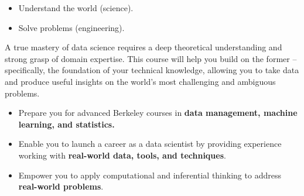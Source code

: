 \documentclass[
  letterpaper,
  DIV=11,
  numbers=noendperiod]{scrreprt}
\providecommand{\tightlist}{%
  \setlength{\itemsep}{0pt}\setlength{\parskip}{0pt}}\usepackage{longtable,booktabs,array}
\begin{document}
\begin{itemize}
\tightlist
\item
  Understand the world (science).
\item
  Solve problems (engineering).
\end{itemize}

A true mastery of data science requires a deep theoretical understanding
and strong grasp of domain expertise. This course will help you build on
the former -- specifically, the foundation of your technical knowledge,
allowing you to take data and produce useful insights on the world's
most challenging and ambiguous problems.

\begin{tcolorbox}[enhanced jigsaw, titlerule=0mm, breakable, opacityback=0, leftrule=.75mm, opacitybacktitle=0.6, colback=white, colframe=quarto-callout-note-color-frame, colbacktitle=quarto-callout-note-color!10!white, left=2mm, rightrule=.15mm, arc=.35mm, toprule=.15mm, coltitle=black, bottomrule=.15mm, bottomtitle=1mm, toptitle=1mm, title=\textcolor{quarto-callout-note-color}{\faInfo}\hspace{0.5em}{Course Goals}]

\begin{itemize}
\tightlist
\item
  Prepare you for advanced Berkeley courses in \textbf{data management,
  machine learning, and statistics.}
\item
  Enable you to launch a career as a data scientist by providing
  experience working with \textbf{real-world data, tools, and
  techniques}.
\item
  Empower you to apply computational and inferential thinking to address
  \textbf{real-world problems}.
\end{itemize}

\end{tcolorbox}
\end{document}
